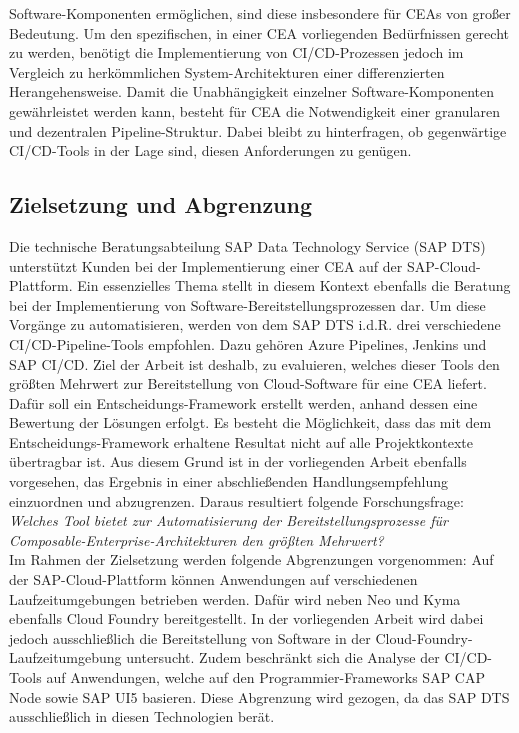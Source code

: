 Software-Komponenten ermöglichen, sind diese insbesondere für CEAs von großer Bedeutung. Um den spezifischen, in einer CEA vorliegenden Bedürfnissen gerecht zu werden, benötigt die Implementierung von CI/CD-Prozessen jedoch im Vergleich zu herkömmlichen System-Architekturen einer differenzierten Herangehensweise. Damit die Unabhängigkeit einzelner Software-Komponenten gewährleistet werden kann, besteht für CEA die Notwendigkeit einer granularen und dezentralen Pipeline-Struktur. Dabei bleibt zu hinterfragen, ob gegenwärtige CI/CD-Tools in der Lage sind, diesen Anforderungen zu genügen.


\subsection{Zielsetzung und Abgrenzung}
Die technische Beratungsabteilung SAP Data Technology Service (\acs{SAP DTS}) unterstützt Kunden bei der Implementierung einer CEA auf der SAP-Cloud-Plattform. 
Ein essenzielles Thema stellt in diesem Kontext ebenfalls die Beratung bei der Implementierung von Software-Bereitstellungsprozessen dar. Um diese Vorgänge zu automatisieren, werden von dem SAP DTS i.d.R. drei verschiedene CI/CD-Pipeline-Tools empfohlen. Dazu gehören Azure Pipelines, Jenkins und  \acs{SAP CI/CD}. Ziel der Arbeit ist deshalb, zu evaluieren, welches dieser Tools den größten Mehrwert zur Bereitstellung von Cloud-Software für eine CEA liefert. Dafür soll ein Entscheidungs-Framework erstellt werden, anhand dessen eine Bewertung der Lösungen erfolgt. Es besteht die Möglichkeit, dass das mit dem Entscheidungs-Framework erhaltene Resultat nicht auf alle Projektkontexte übertragbar ist. Aus diesem Grund ist in der vorliegenden Arbeit ebenfalls vorgesehen, das Ergebnis in einer abschließenden Handlungsempfehlung einzuordnen und abzugrenzen. Daraus resultiert folgende Forschungsfrage:\\
\textit{Welches Tool bietet zur Automatisierung der Bereitstellungsprozesse für Composable-\-Enterprise-Architekturen den größten Mehrwert?}\\
Im Rahmen der Zielsetzung werden folgende Abgrenzungen vorgenommen: Auf der SAP-Cloud-Plattform können Anwendungen auf verschiedenen Laufzeitumgebungen betrieben werden. Dafür wird neben Neo und Kyma ebenfalls Cloud Foundry bereitgestellt. In der vorliegenden Arbeit wird dabei jedoch ausschließlich die Bereitstellung von Software in der Cloud-Foundry-Laufzeitumgebung untersucht. Zudem beschränkt sich die Analyse der CI/CD-Tools auf Anwendungen, welche auf den Programmier-Frameworks SAP CAP Node sowie SAP UI5 basieren. Diese Abgrenzung wird gezogen, da das SAP DTS ausschließlich in diesen Technologien berät.  

